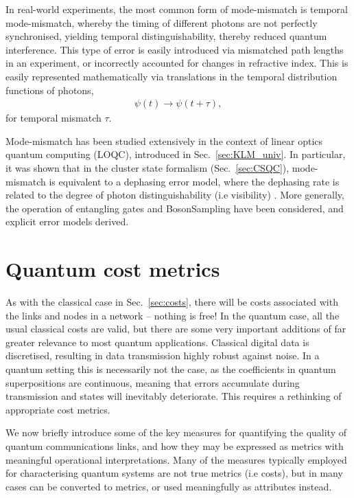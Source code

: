\documentclass[aps,rmp,twocolumn,amsmath,amssymb,nofootinbib,superscriptaddress]{revtex4}
\begin{document}
In real-world experiments, the most common form of mode-mismatch is temporal mode-mismatch, whereby the timing of different photons are not perfectly synchronised, yielding temporal distinguishability, thereby reduced quantum interference. This type of error is easily introduced via mismatched path lengths in an experiment, or incorrectly accounted for changes in refractive index. This is easily represented mathematically via translations in the temporal distribution functions of photons,
\begin{align}
\psi(t) \to \psi(t+\tau),
\end{align}
for temporal mismatch $\tau$.

Mode-mismatch has been studied extensively in the context of linear optics quantum computing (LOQC), introduced in Sec.~\ref{sec:KLM_univ}. In particular, it was shown that in the cluster state formalism (Sec.~\ref{sec:CSQC}), mode-mismatch is equivalent to a dephasing error model, where the dephasing rate is related to the degree of photon distinguishability (i.e visibility) \cite{bib:RohdeRalph06}. More generally, the operation of entangling gates \cite{bib:RohdeFreqTemp05, bib:RohdeGateChar05, bib:RohdeOptPhot05, bib:RohdeTimeRes11} and {\sc BosonSampling} \cite{bib:RohdeArbSpec15, bib:RohdeArbLow12} have been considered, and explicit error models derived.

%
%

\section{Quantum cost metrics} \label{sec:quantum_meas_cost}

As with the classical case in Sec.~\ref{sec:costs}, there will be costs associated with the links and nodes in a network -- nothing is free! In the quantum case, all the usual classical costs are valid, but there are some very important additions of far greater relevance to most quantum applications. Classical digital data is discretised, resulting in data transmission highly robust against noise. In a quantum setting this is necessarily not the case, as the coefficients in quantum superpositions are continuous, meaning that errors accumulate during transmission and states will inevitably deteriorate. This requires a rethinking of appropriate cost metrics.

We now briefly introduce some of the key measures for quantifying the quality of quantum communications links, and how they may be expressed as metrics with meaningful operational interpretations. Many of the measures typically employed for characterising quantum systems are not true metrics (i.e costs), but in many cases can be converted to metrics, or used meaningfully as attributes instead.
\end{document}
